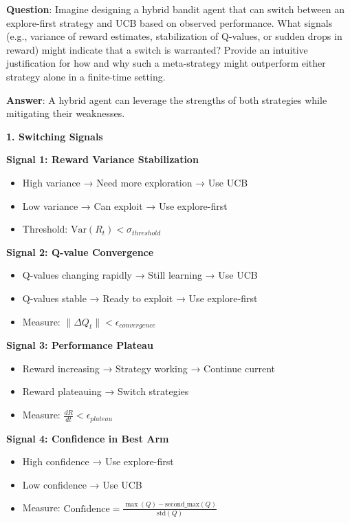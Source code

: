 \documentclass[12pt]{article}
\begin{document}
{{{\textbf{Question}: Imagine designing a hybrid bandit agent that can switch between an explore-first strategy and UCB based on observed performance. What signals (e.g., variance of reward estimates, stabilization of Q-values, or sudden drops in reward) might indicate that a switch is warranted? Provide an intuitive justification for how and why such a meta-strategy might outperform either strategy alone in a finite-time setting.

\textbf{Answer}: A hybrid agent can leverage the strengths of both strategies while mitigating their weaknesses.

\textbf{1. Switching Signals}

\textbf{Signal 1: Reward Variance Stabilization}
\begin{itemize}
\item High variance → Need more exploration → Use UCB
\item Low variance → Can exploit → Use explore-first
\item Threshold: $\text{Var}(R_t) < \sigma_{threshold}$
\end{itemize}

\textbf{Signal 2: Q-value Convergence}
\begin{itemize}
\item Q-values changing rapidly → Still learning → Use UCB
\item Q-values stable → Ready to exploit → Use explore-first
\item Measure: $\|\Delta Q_t\| < \epsilon_{convergence}$
\end{itemize}

\textbf{Signal 3: Performance Plateau}
\begin{itemize}
\item Reward increasing → Strategy working → Continue current
\item Reward plateauing → Switch strategies
\item Measure: $\frac{dR}{dt} < \epsilon_{plateau}$
\end{itemize}

\textbf{Signal 4: Confidence in Best Arm}
\begin{itemize}
\item High confidence → Use explore-first
\item Low confidence → Use UCB
\item Measure: $\text{Confidence} = \frac{\max(Q) - \text{second\_max}(Q)}{\text{std}(Q)}$
\end{itemize}

}}}
\end{document}
